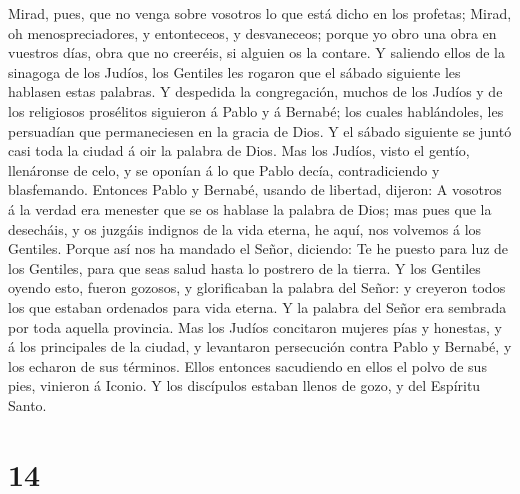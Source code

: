  Mirad, pues, que no venga sobre vosotros lo que está dicho
en los profetas;  Mirad, oh menospreciadores, y
entonteceos, y desvaneceos; porque yo obro una obra en vuestros días,
obra que no creeréis, si alguien os la contare.  Y saliendo
ellos de la sinagoga de los Judíos, los Gentiles les rogaron que el
sábado siguiente les hablasen estas palabras.  Y despedida
la congregación, muchos de los Judíos y de los religiosos prosélitos
siguieron á Pablo y á Bernabé; los cuales hablándoles, les persuadían
que permaneciesen en la gracia de Dios.  Y el sábado
siguiente se juntó casi toda la ciudad á oir la palabra de Dios.
 Mas los Judíos, visto el gentío, llenáronse de celo, y se
oponían á lo que Pablo decía, contradiciendo y blasfemando.
 Entonces Pablo y Bernabé, usando de libertad, dijeron: A
vosotros á la verdad era menester que se os hablase la palabra de Dios;
mas pues que la desecháis, y os juzgáis indignos de la vida eterna, he
aquí, nos volvemos á los Gentiles.  Porque así nos ha
mandado el Señor, diciendo: Te he puesto para luz de los Gentiles, para
que seas salud hasta lo postrero de la tierra.  Y los
Gentiles oyendo esto, fueron gozosos, y glorificaban la palabra del
Señor: y creyeron todos los que estaban ordenados para vida eterna.
 Y la palabra del Señor era sembrada por toda aquella
provincia.  Mas los Judíos concitaron mujeres pías y
honestas, y á los principales de la ciudad, y levantaron persecución
contra Pablo y Bernabé, y los echaron de sus términos. 
Ellos entonces sacudiendo en ellos el polvo de sus pies, vinieron á
Iconio.  Y los discípulos estaban llenos de gozo, y del
Espíritu Santo.

\hypertarget{section-13}{%
\section{14}\label{section-13}}

